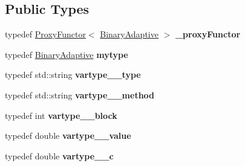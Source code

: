 \subsection*{Public Types}
\begin{DoxyCompactItemize}
\item 
\mbox{\label{classfilter_1_1algos_1_1_binary_adaptive_aebe508f3835087e12db5ec809fca32ee}} 
typedef \hyperlink{class_proxy_functor}{Proxy\+Functor}$<$ \hyperlink{classfilter_1_1algos_1_1_binary_adaptive}{Binary\+Adaptive} $>$ {\bfseries \+\_\+proxy\+Functor}
\item 
\mbox{\label{classfilter_1_1algos_1_1_binary_adaptive_a289438d25158f006118906c0498a5a41}} 
typedef \hyperlink{classfilter_1_1algos_1_1_binary_adaptive}{Binary\+Adaptive} {\bfseries mytype}
\item 
\mbox{\label{classfilter_1_1algos_1_1_binary_adaptive_a9e7c7117788e8bf76a2f65ca7fd0e516}} 
typedef std\+::string {\bfseries vartype\+\_\+\+\_\+type}
\item 
\mbox{\label{classfilter_1_1algos_1_1_binary_adaptive_a1d8556ac91145da50fb57a87aaad732f}} 
typedef std\+::string {\bfseries vartype\+\_\+\+\_\+method}
\item 
\mbox{\label{classfilter_1_1algos_1_1_binary_adaptive_a3175af4559a3708edf39baa929acb3c3}} 
typedef int {\bfseries vartype\+\_\+\+\_\+block}
\item 
\mbox{\label{classfilter_1_1algos_1_1_binary_adaptive_ac3980041c1ea2adb95093309740295b5}} 
typedef double {\bfseries vartype\+\_\+\+\_\+value}
\item 
\mbox{\label{classfilter_1_1algos_1_1_binary_adaptive_a50633e873f900f1399952076d0ddd5b5}} 
typedef double {\bfseries vartype\+\_\+\+\_\+c}
\end{DoxyCompactItemize}
